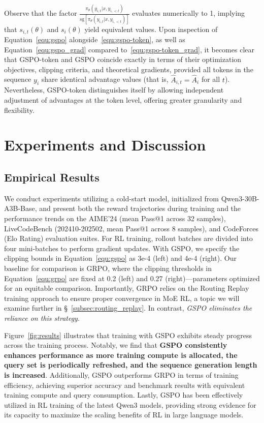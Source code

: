 Observe that the factor $\frac{ \pi_{\theta} (y_{i,t} | x, y_{i,<t}) }{ \mathrm{sg} \left[ \pi_{\theta} (y_{i,t} | x, y_{i,<t}) \right] }$ evaluates numerically to 1, implying that $s_{i,t}(\theta)$ and $s_{i}(\theta)$ yield equivalent values. Upon inspection of Equation~\eqref{equ:gspo} alongside~\eqref{equ:gspo-token}, as well as Equation~\eqref{equ:gspo_grad} compared to~\eqref{equ:gspo-token_grad}, it becomes clear that GSPO-token and GSPO coincide exactly in terms of their optimization objectives, clipping criteria, and theoretical gradients, provided all tokens in the sequence $y_i$ share identical advantage values (that is, $\widehat{A}_{i,t} = \widehat{A}_i$ for all $t$). Nevertheless, GSPO-token distinguishes itself by allowing independent adjustment of advantages at the token level, offering greater granularity and flexibility.

\section{Experiments and Discussion}

\subsection{Empirical Results}

We conduct experiments utilizing a cold-start model, initialized from Qwen3-30B-A3B-Base, and present both the reward trajectories during training and the performance trends on the AIME'24 (mean Pass@1 across 32 samples), LiveCodeBench (202410-202502, mean Pass@1 across 8 samples), and CodeForces (Elo Rating) evaluation suites. For RL training, rollout batches are divided into four mini-batches to perform gradient updates. With GSPO, we specify the clipping bounds in Equation~\eqref{equ:gspo} as 3e-4 (left) and 4e-4 (right). Our baseline for comparison is GRPO, where the clipping thresholds in Equation~\eqref{equ:grpo} are fixed at 0.2 (left) and 0.27 (right)—parameters optimized for an equitable comparison. Importantly, GRPO relies on the Routing Replay training approach to ensure proper convergence in MoE RL, a topic we will examine further in \S~\ref{subsec:routing_replay}. In contrast, \textit{GSPO eliminates the reliance on this strategy}.

Figure~\ref{fig:results} illustrates that training with GSPO exhibits steady progress across the training process. Notably, we find that \textbf{GSPO consistently enhances performance as more training compute is allocated, the query set is periodically refreshed, and the sequence generation length is increased}. Additionally, GSPO outperforms GRPO in terms of training efficiency, achieving superior accuracy and benchmark results with equivalent training compute and query consumption. Lastly, GSPO has been effectively utilized in RL training of the latest Qwen3 models, providing strong evidence for its capacity to maximize the scaling benefits of RL in large language models.

